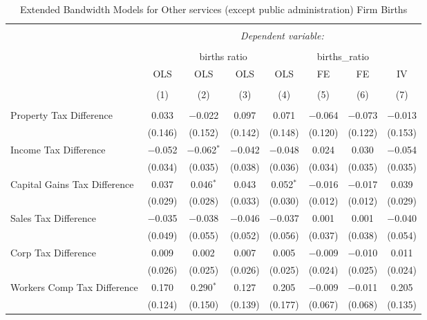 
\begin{table}[!htbp] \centering 
  \caption{Extended Bandwidth Models for  Other services (except public administration) Firm Births} 
  \label{} 
\begin{tabular}{@{\extracolsep{5pt}}lccccccc} 
\\[-1.8ex]\hline 
\hline \\[-1.8ex] 
 & \multicolumn{7}{c}{\textit{Dependent variable:}} \\ 
\cline{2-8} 
\\[-1.8ex] & \multicolumn{4}{c}{births ratio} & \multicolumn{2}{c}{births\_ratio} &   \\ 
 & OLS & OLS & OLS & OLS & FE & FE & IV \\ 
\\[-1.8ex] & (1) & (2) & (3) & (4) & (5) & (6) & (7)\\ 
\hline \\[-1.8ex] 
 Property Tax Difference & 0.033 & $-$0.022 & 0.097 & 0.071 & $-$0.064 & $-$0.073 & $-$0.013 \\ 
  & (0.146) & (0.152) & (0.142) & (0.148) & (0.120) & (0.122) & (0.153) \\ 
  Income Tax Difference & $-$0.052 & $-$0.062$^{*}$ & $-$0.042 & $-$0.048 & 0.024 & 0.030 & $-$0.054 \\ 
  & (0.034) & (0.035) & (0.038) & (0.036) & (0.034) & (0.035) & (0.035) \\ 
  Capital Gains Tax Difference & 0.037 & 0.046$^{*}$ & 0.043 & 0.052$^{*}$ & $-$0.016 & $-$0.017 & 0.039 \\ 
  & (0.029) & (0.028) & (0.033) & (0.030) & (0.012) & (0.012) & (0.029) \\ 
  Sales Tax Difference & $-$0.035 & $-$0.038 & $-$0.046 & $-$0.037 & 0.001 & 0.001 & $-$0.040 \\ 
  & (0.049) & (0.055) & (0.052) & (0.056) & (0.037) & (0.038) & (0.054) \\ 
  Corp Tax Difference & 0.009 & 0.002 & 0.007 & 0.005 & $-$0.009 & $-$0.010 & 0.011 \\ 
  & (0.026) & (0.025) & (0.026) & (0.025) & (0.024) & (0.025) & (0.024) \\ 
  Workers Comp Tax Difference & 0.170 & 0.290$^{*}$ & 0.127 & 0.205 & $-$0.009 & $-$0.011 & 0.205 \\ 
  & (0.124) & (0.150) & (0.139) & (0.177) & (0.067) & (0.068) & (0.135) \\ 

\end{tabular}
\end{table}
